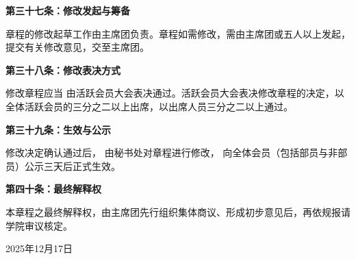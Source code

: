 \documentclass{mjsart}
\begin{document}
\textbf{第三十七条：修改发起与筹备}

章程的修改起草工作由主席团负责。章程如需修改，需由主席团或五人以上发起，提交有关修改意见，交至主席团。

\textbf{第三十八条：修改表决方式}

修改章程应当 由活跃会员大会表决通过。活跃会员大会表决修改章程的决定，以全体活跃会员的三分之二以上出席，以出席人员三分之二以上通过。

\textbf{第三十九条：生效与公示}

修改决定确认通过后， 由秘书处对章程进行修改， 向全体会员（包括部员与非部员）公示三天后正式生效。

\textbf{第四十条：最终解释权}

本章程之最终解释权，由主席团先行组织集体商议、形成初步意见后，再依规报请学院审议核定。

2025年12月17日
\end{document}
